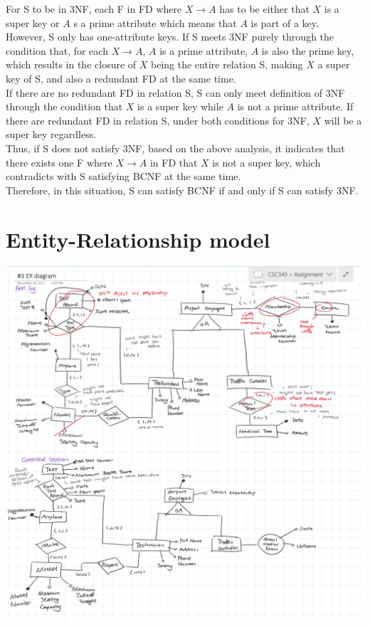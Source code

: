 \documentclass{article}
\begin{document}
\begin{enumerate}
    For S to be in 3NF, each F in FD where $X \rightarrow A$ has to be either that $X$ is a super key or $A$ s a prime attribute which means that $A$ is part of a key. \\
    
    However, S only has one-attribute keys. If S meets 3NF purely through the condition that, for each $X \rightarrow A$, $A$ is a prime attribute, $A$ is also the prime key, which results in the closure of $X$ being the entire relation S, making $X$ a super key of S, and also a redundant FD at the same time.\\
    
    If there are no redundant FD in relation S, S can only meet definition of 3NF through the condition that $X$ is a super key while $A$ is not a prime attribute. If there are redundant FD in relation S, under both conditions for 3NF, $X$ will be a super key regardless.\\
    
    Thus, if S does not satisfy 3NF, based on the above analysis, it indicates that there exists one F where $X \rightarrow A$ in FD that $X$ is not a super key, which contradicts with S satisfying BCNF at the same time.\\
    
    Therefore, in this situation, S can satisfy BCNF if and only if S can satisfy 3NF.\\
    
\end{enumerate}

\section{Entity-Relationship model}

\includegraphics[width=\textwidth]{ER diagram.png}
\end{document}
